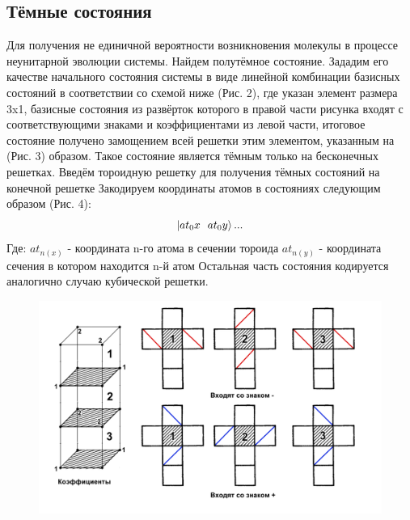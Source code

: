 \documentclass[12pt, a4paper]{article}
\begin{document}
\subsection{Тёмные состояния}
\qquad Для получения не единичной вероятности возникновения молекулы в процессе неунитарной эволюции системы. Найдем полутёмное состояние. Зададим его качестве начального состояния системы в виде линейной комбинации базисных состояний в соответствии со схемой ниже (Рис. 2), где указан элемент размера 3x1, базисные состояния из развёрток которого в правой части рисунка входят с соответствующими знаками и коэффициентами из левой части, итоговое состояние получено замощением всей решетки этим элементом, указанным на (Рис. 3) образом. Такое состояние является тёмным только на бесконечных решетках.\newline
\qquad Введём тороидную решетку для получения тёмных состояний на конечной решетке\newline
Закодируем координаты атомов в состояниях следующим образом (Рис. 4):
\[\ket{at_0x\ \ at_0y}...\]
Где:\newline
$at_{n(x)}$ - координата n-го атома в сечении тороида\newline
$at_{n(y)}$ - координата сечения в котором находится n-й атом\newline
Остальная часть состояния кодируется аналогично случаю кубической решетки.
\begin{figure}[htp]
\centering
\includegraphics[scale=0.20]{PTS.png}
\caption{}
\label{}
\end{figure}
\end{document}
